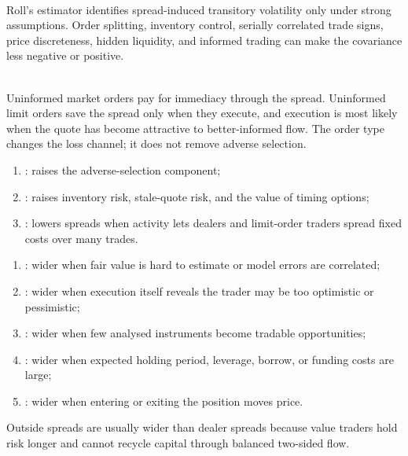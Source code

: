 \documentclass[a4paper,oneside,openany]{book}
\begin{document}
\begin{caveat} \\
Roll's estimator identifies spread-induced transitory volatility only under strong assumptions. Order splitting, inventory control, serially correlated trade signs, price discreteness, hidden liquidity, and informed trading can make the covariance less negative or positive.
\end{caveat}

\begin{principle} \\
Uninformed market orders pay for immediacy through the spread. Uninformed limit orders save the spread only when they execute, and execution is most likely when the quote has become attractive to better-informed flow. The order type changes the loss channel; it does not remove adverse selection.
\end{principle}

\begin{taxonomy} 
\begin{enumerate}[label=\roman*.]
\setlength{\itemsep}{0pt}
\item {}: raises the adverse-selection component;
\item {}: raises inventory risk, stale-quote risk, and the value of timing options;
\item {}: lowers spreads when activity lets dealers and limit-order traders spread fixed costs over many trades.
\end{enumerate}
\end{taxonomy}

\begin{taxonomy} 
\begin{enumerate}[label=\roman*.]
\setlength{\itemsep}{0pt}
\item {}: wider when fair value is hard to estimate or model errors are correlated;
\item {}: wider when execution itself reveals the trader may be too optimistic or pessimistic;
\item {}: wider when few analysed instruments become tradable opportunities;
\item {}: wider when expected holding period, leverage, borrow, or funding costs are large;
\item {}: wider when entering or exiting the position moves price.
\end{enumerate}
Outside spreads are usually wider than dealer spreads because value traders hold risk longer and cannot recycle capital through balanced two-sided flow.
\end{taxonomy}
\end{document}
